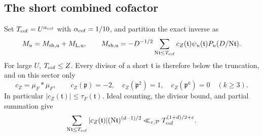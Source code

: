 \documentclass[11pt]{article}
\theoremstyle{definition}
\newcommand{\N}{\mathrm N}
\newcommand{\eps}{\varepsilon}
\begin{document}
\subsection{The short combined cofactor}

Set $T_{\rm cof}=U^{\alpha_{\rm cof}}$ with $\alpha_{\rm cof}=1/10$, and partition the exact inverse as
\begin{equation}\label{bil-sector-decomposition}
 M_u=M_{\rm sh,u}+M_{\rm L,u},\qquad
 M_{\rm sh,u}=-D^{-1/2}\sum_{\N\mathfrak t\le T_{\rm cof}}
 c_Z(\mathfrak t)\psi_u(\mathfrak t)P_u(D/\N\mathfrak t).
\end{equation}
For large $U$, $T_{\rm cof}\le Z$.  Every divisor of a short $\mathfrak t$
is therefore below the truncation, and on this sector only
\begin{equation}\label{bil-short-local-coefficient}
 c_Z=\mu_F*\mu_F,\qquad
 c_Z(\mathfrak p)=-2,\quad c_Z(\mathfrak p^2)=1,
 \quad c_Z(\mathfrak p^k)=0\quad(k\ge3).
\end{equation}
In particular $|c_Z(\mathfrak t)|\le\tau_F(\mathfrak t)$.
Ideal counting, the divisor bound, and partial summation give
\begin{equation}\label{bil-divisor-sum}
 \sum_{\N\mathfrak t\le T_{\rm cof}}|c_Z(\mathfrak t)|
        (\N\mathfrak t)^{(d-1)/2}
       \ll_{\eps,\mathcal P}T_{\rm cof}^{(1+d)/2+\eps}.
\end{equation}
\end{document}
